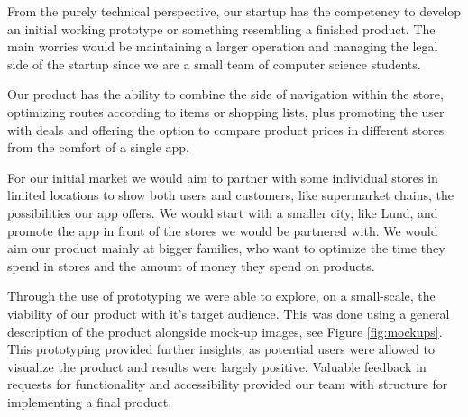 \documentclass[titlepage]{article}
\begin{document}
From the purely technical perspective, our startup has the competency to develop an initial working prototype or something resembling a finished product. The main worries would be maintaining a larger operation and managing the legal side of the startup since we are a small team of computer science students.

Our product has the ability to combine the side of navigation within the store, optimizing routes according to items or shopping lists, plus promoting the user with deals and offering the option to compare product prices in different stores from the comfort of a single app.

For our initial market we would aim to partner with some individual stores in limited locations to show both users and customers, like supermarket chains, the possibilities our app offers. We would start with a smaller city, like Lund, and promote the app in front of the stores we would be partnered with. We would aim our product mainly at bigger families, who want to optimize the time they spend in stores and the amount of money they spend on products.

Through the use of prototyping we were able to explore, on a small-scale, the viability of our product with it's target audience. This was done using a general description of the product alongside mock-up images, see Figure \ref{fig:mockups}.
This prototyping provided further insights, as potential users were allowed to visualize the product and results were largely positive. Valuable feedback in requests for functionality and accessibility provided our team with structure for implementing a final product.
\end{document}

